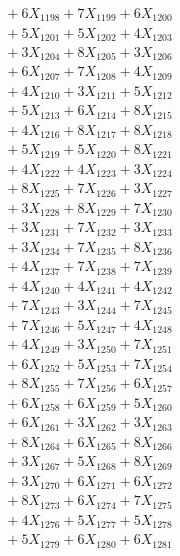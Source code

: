 \documentclass[a4paper,10pt]{article}
\begin{document}
{\begin{align}
&\;  + 6 X_{1198} + 7 X_{1199} + 6 X_{1200} \\[0.3ex]
&\;  + 5 X_{1201} + 5 X_{1202} + 4 X_{1203} \\[0.3ex]
&\;  + 3 X_{1204} + 8 X_{1205} + 3 X_{1206} \\[0.3ex]
&\;  + 6 X_{1207} + 7 X_{1208} + 4 X_{1209} \\[0.5ex]\allowbreak
&\;  + 4 X_{1210} + 3 X_{1211} + 5 X_{1212} \\[0.3ex]
&\;  + 5 X_{1213} + 6 X_{1214} + 8 X_{1215} \\[0.3ex]
&\;  + 4 X_{1216} + 8 X_{1217} + 8 X_{1218} \\[0.3ex]
&\;  + 5 X_{1219} + 5 X_{1220} + 8 X_{1221} \\[0.3ex]
&\;  + 4 X_{1222} + 4 X_{1223} + 3 X_{1224} \\[0.3ex]
&\;  + 8 X_{1225} + 7 X_{1226} + 3 X_{1227} \\[0.3ex]
&\;  + 3 X_{1228} + 8 X_{1229} + 7 X_{1230} \\[0.3ex]
&\;  + 3 X_{1231} + 7 X_{1232} + 3 X_{1233} \\[0.3ex]
&\;  + 3 X_{1234} + 7 X_{1235} + 8 X_{1236} \\[0.3ex]
&\;  + 4 X_{1237} + 7 X_{1238} + 7 X_{1239} \\[0.5ex]\allowbreak
&\;  + 4 X_{1240} + 4 X_{1241} + 4 X_{1242} \\[0.3ex]
&\;  + 7 X_{1243} + 3 X_{1244} + 7 X_{1245} \\[0.3ex]
&\;  + 7 X_{1246} + 5 X_{1247} + 4 X_{1248} \\[0.3ex]
&\;  + 4 X_{1249} + 3 X_{1250} + 7 X_{1251} \\[0.3ex]
&\;  + 6 X_{1252} + 5 X_{1253} + 7 X_{1254} \\[0.3ex]
&\;  + 8 X_{1255} + 7 X_{1256} + 6 X_{1257} \\[0.3ex]
&\;  + 6 X_{1258} + 6 X_{1259} + 5 X_{1260} \\[0.3ex]
&\;  + 6 X_{1261} + 3 X_{1262} + 3 X_{1263} \\[0.3ex]
&\;  + 8 X_{1264} + 6 X_{1265} + 8 X_{1266} \\[0.3ex]
&\;  + 3 X_{1267} + 5 X_{1268} + 8 X_{1269} \\[0.5ex]\allowbreak
&\;  + 3 X_{1270} + 6 X_{1271} + 6 X_{1272} \\[0.3ex]
&\;  + 8 X_{1273} + 6 X_{1274} + 7 X_{1275} \\[0.3ex]
&\;  + 4 X_{1276} + 5 X_{1277} + 5 X_{1278} \\[0.3ex]
&\;  + 5 X_{1279} + 6 X_{1280} + 6 X_{1281} \\[0.3ex]

\end{align}}
\end{document}
